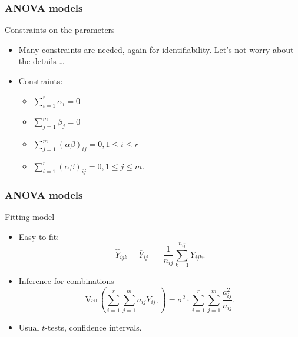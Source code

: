 \documentclass[handout]{beamer}
\begin{document}

   \begin{frame} \frametitle{ANOVA models}

   \begin{block}
   {Constraints on the parameters}
   \begin{itemize}

   \item Many constraints are needed, again for identifiability.
   Let's not worry about the details \dots

   \item Constraints:
   \begin{itemize}

   \item $\sum_{i=1}^r \alpha_i = 0$

   \item $\sum_{j=1}^m \beta_j = 0$

   \item $\sum_{j=1}^m (\alpha\beta)_{ij} = 0, 1 \leq i \leq r$
   \item $\sum_{i=1}^r (\alpha\beta)_{ij} = 0, 1 \leq j \leq m.$
   \end{itemize}
   \end{itemize}
   \end{block}
   \end{frame}


   \begin{frame} \frametitle{ANOVA models}

   \begin{block}
   {Fitting model}
   \begin{itemize}

   \item Easy to fit:
   $$
   \widehat{Y}_{ijk}= \overline{Y}_{ij\cdot} = \frac{1}{n_{ij}}\sum_{k=1}^{n_{ij}} Y_{ijk}.$$
   \item Inference for combinations
   $$\text{Var} \left(\sum_{i=1}^r \sum_{j=1}^m a_{ij} \overline{Y}_{ij\cdot}\right) = \sigma^2 \cdot \sum_{i=1}^r \sum_{j=1}^m \frac{a_{ij}^2}{n_{ij}}.$$

   \item Usual $t$-tests, confidence intervals.
   \end{itemize}
   \end{block}
   \end{frame}
\end{document}
